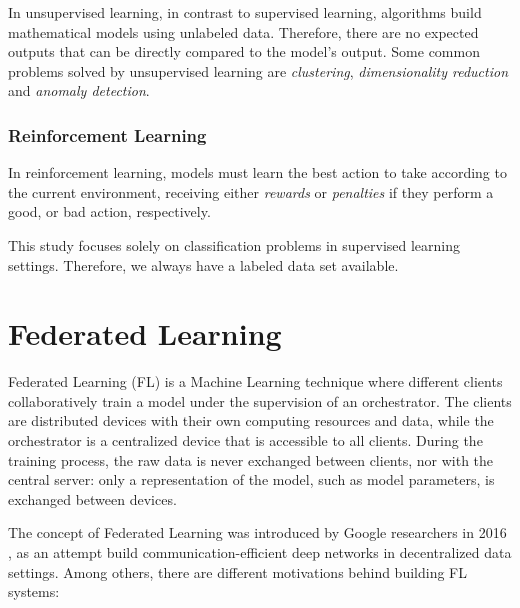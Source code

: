 In unsupervised learning, in contrast to supervised learning, algorithms build mathematical models using unlabeled data. Therefore, there are no expected outputs that can be directly compared to the model's output. Some common problems solved by unsupervised learning are \textit{clustering}, \textit{dimensionality reduction} and \textit{anomaly detection}.

\subsubsection{Reinforcement Learning}

In reinforcement learning, models must learn the best action to take according to the current environment, receiving either \textit{rewards} or \textit{penalties} if they perform a good, or bad action, respectively.

\bigskip

This study focuses solely on classification problems in supervised learning settings. Therefore, we always have a labeled data set available.

\section{Federated Learning}

Federated Learning (FL) is a Machine Learning technique where different clients collaboratively train a model under the supervision of an orchestrator. The clients are distributed devices with their own computing resources and data, while the orchestrator is a centralized device that is accessible to all clients. During the training process, the raw data is never exchanged between clients, nor with the central server: only a representation of the model, such as model parameters, is exchanged between devices.

The concept of Federated Learning was introduced by Google researchers in 2016 \cite{10.48550/arxiv.1602.05629}, as an attempt build communication-efficient deep networks in decentralized data settings. Among others, there are different motivations behind building FL systems:

